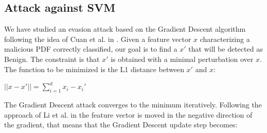 \documentclass[twocolumn, switch]{article} %
\begin{document}
\subsection{Attack against SVM}
\label{subsec:svm}
We have studied an evasion attack based on the Gradient Descent algorithm following the idea of Cuan et al. in \cite{cuan_damien_delaplace_valois_2018}. Given
a feature vector $x$ characterizing a malicious PDF correctly classified, our goal is to find a $x'$ that will be detected as Benign. The constraint is that $x'$ is obtained with a minimal perturbation over $x$. The function to be minimized is the L1 distance between $x'$ and $x$:
\begin{center}
	$||x-x'|| = \sum_{i=1}^{d}x_i-x_i'$
\end{center}

The Gradient Descent attack converges to the minimum iteratively. Following the approach of Li et al. in \cite{li_liu_yan_yang_2022} the feature vector is moved in the negative direction of the gradient, that means that the Gradient Descent update step becomes:
\end{document}
